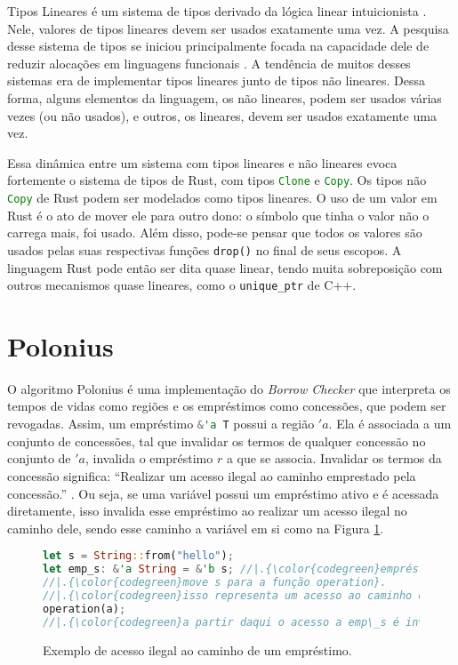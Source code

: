 Tipos Lineares é um sistema de tipos derivado da lógica linear intuicionista \cite{CSLINLOG}. Nele, valores de tipos lineares devem ser usados exatamente uma vez. A pesquisa desse sistema de tipos se iniciou principalmente focada na capacidade dele de reduzir alocações em linguagens funcionais \cite{Wadler1990LinearTC}. A tendência de muitos desses sistemas era de implementar tipos lineares junto de tipos não lineares. Dessa forma, alguns elementos da linguagem, os não lineares, podem ser usados várias vezes (ou não usados), e outros, os lineares, devem ser usados exatamente uma vez. 

Essa dinâmica entre um sistema com tipos lineares e não lineares evoca fortemente o sistema de tipos de Rust, com tipos \lstinline[language=Rust]|Clone| e \lstinline[language=Rust]|Copy|. Os tipos não \lstinline[language=Rust]|Copy| de Rust podem ser modelados como tipos lineares. O uso de um valor em Rust é o ato de mover ele para outro dono: o símbolo que tinha o valor não o carrega mais, foi usado. Além disso, pode-se pensar que todos os valores são usados pelas suas respectivas funções \lstinline[language=Rust]|drop()| no final de seus escopos. A linguagem Rust pode então ser dita quase linear, tendo muita sobreposição com outros mecanismos quase lineares, como o \lstinline[language=C]|unique_ptr| de C++. 

\section{Polonius}
\label{sec:chap4:polonius}


O algoritmo Polonius é uma implementação do \emph{Borrow Checker} que interpreta os tempos de vidas como regiões e os empréstimos como concessões, que podem ser revogadas. Assim, um empréstimo \lstinline[language=Rust]|&'a T| possui a região $'a$. Ela é associada a um conjunto de concessões, tal que invalidar os termos de qualquer concessão no conjunto de $'a$, invalida o empréstimo $r$ a que se associa. Invalidar os termos da concessão significa: ``Realizar um acesso ilegal ao caminho emprestado pela concessão.'' \cite{Matsakis2018}. Ou seja, se uma variável possui um empréstimo ativo e é acessada diretamente, isso invalida esse empréstimo ao realizar um acesso ilegal no caminho dele, sendo esse caminho a variável em si como na Figura \ref{fig:ex:polonius}. 
\begin{figure}[ht]
	\caption{Exemplo de acesso ilegal ao caminho de um empréstimo.}
	\label{fig:ex:polonius}
	\begin{lstlisting}[language=Rust]
let s = String::from("hello");
let emp_s: &'a String = &'b s; //|.{\color{codegreen}empréstimo realizado a s}.
//|.{\color{codegreen}move s para a função operation}.
//|.{\color{codegreen}isso representa um acesso ao caminho de emp\_s, o acesso a s em sí}.
operation(a); 
//|.{\color{codegreen}a partir daqui o acesso a emp\_s é inválido}.
	\end{lstlisting}
\end{figure}

